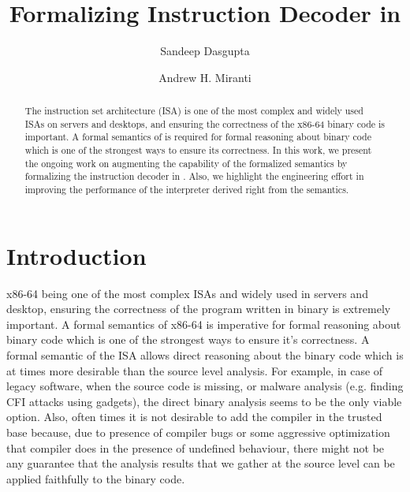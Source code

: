 \documentclass[a4paper,UKenglish,cleveref, autoref]{lipics-v2019}
\title{Formalizing \ISA Instruction Decoder in \K} %
\author{Sandeep Dasgupta}{University of Illinois at Urbana Champaign, USA \and \url{http://sdasgup3.web.engr.illinois.edu} }{sdasgup3@illinois.edu}{}{}
\author{Andrew H. Miranti}{University of Illinois at Urbana Champaign, USA}{miranti2@illinois.edu}{}{}
\begin{document}
\maketitle

\begin{abstract}
    The \ISA instruction set architecture (ISA) is one of the
    most complex and widely used ISAs on servers and desktops,
    and ensuring the correctness of the x86-64 binary code is
    important. A formal semantics of \ISA is required for formal reasoning
    about binary code which is one of the strongest ways to ensure
    its correctness. 
    In this work, we present the ongoing work on augmenting the capability of the formalized semantics by formalizing the instruction decoder in \K. Also, we highlight  the engineering effort in improving the performance of the interpreter derived right from the semantics. 
\end{abstract}

\section{Introduction}
\label{sec:intro}
x86-64 being one of the most complex ISAs and widely used in servers and desktop, ensuring the correctness of the program written in binary is extremely important. A formal semantics of x86-64 is imperative for formal reasoning about binary code which is  one of the strongest ways to ensure it's correctness. A formal semantic of the ISA allows direct reasoning about the binary code which is at times more desirable than the source level analysis. For example, in case of legacy software, when the source code is missing, or malware analysis (e.g. finding CFI attacks using gadgets), the direct binary analysis seems to be the only viable option.  Also, often times it is not desirable to add the compiler in the trusted base because, due to presence of compiler bugs or some aggressive optimization that compiler does in the presence of undefined behaviour, there might not be any guarantee that the analysis results that we gather at the source level  can be applied faithfully to the binary code.  
\end{document}
